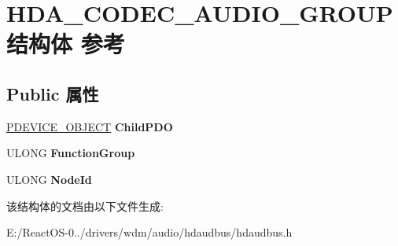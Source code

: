 \hypertarget{struct_h_d_a___c_o_d_e_c___a_u_d_i_o___g_r_o_u_p}{}\section{H\+D\+A\+\_\+\+C\+O\+D\+E\+C\+\_\+\+A\+U\+D\+I\+O\+\_\+\+G\+R\+O\+U\+P结构体 参考}
\label{struct_h_d_a___c_o_d_e_c___a_u_d_i_o___g_r_o_u_p}
\subsection*{Public 属性}
\begin{DoxyCompactItemize}
\item 
\mbox{\label{struct_h_d_a___c_o_d_e_c___a_u_d_i_o___g_r_o_u_p_adab930947513c449f4a96d9e99f9586f}} 
\hyperlink{struct___d_e_v_i_c_e___o_b_j_e_c_t}{P\+D\+E\+V\+I\+C\+E\+\_\+\+O\+B\+J\+E\+CT} {\bfseries Child\+P\+DO}
\item 
\mbox{\label{struct_h_d_a___c_o_d_e_c___a_u_d_i_o___g_r_o_u_p_ad5e79b96839905a0e50804bb31bffacf}} 
U\+L\+O\+NG {\bfseries Function\+Group}
\item 
\mbox{\label{struct_h_d_a___c_o_d_e_c___a_u_d_i_o___g_r_o_u_p_aa4d5c4c5649c8c366ebc84ebf0364852}} 
U\+L\+O\+NG {\bfseries Node\+Id}
\end{DoxyCompactItemize}


该结构体的文档由以下文件生成\+:\begin{DoxyCompactItemize}
\item 
E\+:/\+React\+O\+S-\/0../drivers/wdm/audio/hdaudbus/hdaudbus.\+h\end{DoxyCompactItemize}
